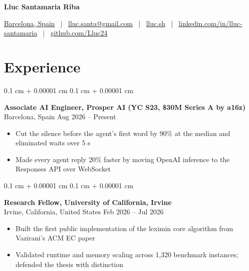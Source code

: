 \documentclass[10pt, letterpaper]{article}
\newenvironment{highlights}{
    \begin{itemize}[
        topsep=0.06 cm,
        parsep=0.06 cm,
        partopsep=0pt,
        itemsep=0pt,
        leftmargin=10pt
    ]
}{
    \end{itemize}
} %
\newenvironment{onecolentry}{
    \begin{adjustwidth}{
        0.1 cm + 0.00001 cm
    }{
        0.1 cm + 0.00001 cm
    }
}{
    \end{adjustwidth}
} %
\newenvironment{entry}{
    \begin{onecolentry}
}{
    \end{onecolentry}
} %
\newcommand{\locsep}{\quad\textbar\quad}
\newcommand{\barcelona}{\href{https://maps.app.goo.gl/cVp9mjtK3oULJvvq6}{Barcelona, Spain}}
\begin{document}
    \begin{center}
        \fontsize{22 pt}{22 pt}\selectfont\textbf{Lluc Santamaria Riba}

        \vspace{0.12 cm}

        \small
        \barcelona
        \, | \,
        \href{mailto:lluc.santa@gmail.com}{lluc.santa@gmail.com}
        \, | \,
        \href{https://lluc.sh}{lluc.sh}
        \, | \,
        \href{https://linkedin.com/in/lluc-santamaria}{linkedin.com/in/lluc-santamaria}
        \, | \,
        \href{https://github.com/Lluc24}{github.com/Lluc24}
    \end{center}

    \vspace{0.13 cm}


    \section{Experience}

        \begin{entry}
            \textbf{Associate AI Engineer, Prosper AI (YC S23, \$30M Series A by a16z)} \\
            Barcelona, Spain \locsep Aug 2026 -- Present
            \begin{highlights}
                \item Cut the silence before the agent's first word by 90\% at the median and eliminated waits over 5 s
                \item Made every agent reply 20\% faster by moving OpenAI inference to the Responses API over WebSocket
            \end{highlights}
        \end{entry}

        \vspace{0.13 cm}

        \begin{entry}
            \textbf{Research Fellow, University of California, Irvine} \\
            Irvine, California, United States \locsep Feb 2026 -- Jul 2026
            \begin{highlights}
                \item Built the first public implementation of the leximin core algorithm from Vazirani's ACM EC paper
                \item Validated runtime and memory scaling across 1,320 benchmark instances; defended the thesis with distinction
            \end{highlights}
        \end{entry}
\end{document}
